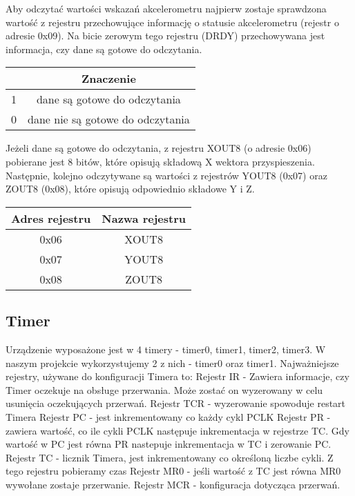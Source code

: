 \documentclass{classrep}
\begin{document}
		Aby odczytać wartości wskazań akcelerometru najpierw zostaje sprawdzona wartość z rejestru przechowujące informację o statusie akcelerometru (rejestr o adresie 0x09). Na bicie zerowym tego rejestru (DRDY) przechowywana jest informacja, czy dane są gotowe do odczytania.
\begin{center}
			\begin{tabular}{|c|c|}
			\hline 
			\vtop{\hbox{\strut \textbf{Wartość na bicie DRDY}}\hbox{\strut \textbf{rejestru 0x09}}} & \textbf{Znaczenie} \\ 
			\hline 
			1 & dane są gotowe do odczytania \\ 
			\hline 
			0 & dane nie są gotowe do odczytania \\ 
			\hline 
		\end{tabular} 
\end{center}
		
		Jeżeli dane są gotowe do odczytania, z rejestru XOUT8 (o adresie 0x06) pobierane jest 8 bitów, które opisują składową X wektora przyspieszenia. Następnie, kolejno odczytywane są wartości z rejestrów YOUT8 (0x07) oraz ZOUT8 (0x08), które opisują odpowiednio składowe Y i Z. 
		
\begin{center}
			\begin{tabular}{|c|c|}
			\hline 
			\textbf{Adres rejestru} & \textbf{Nazwa rejestru} \\ 
			\hline 
			0x06 & XOUT8 \\ 
			\hline 
			0x07 & YOUT8 \\ 
			\hline 
			0x08 &  ZOUT8\\ 
			\hline 
		\end{tabular} 
\end{center}
			
		\subsection{Timer}
		Urządzenie wyposażone jest w 4 timery - timer0, timer1, timer2, timer3. W naszym projekcie wykorzystujemy 2 z nich - timer0 oraz timer1. 
		\newline Najważniejsze rejestry, używane do konfiguracji Timera to:
		\newline \textbullet Rejestr IR - Zawiera informacje, czy Timer oczekuje na obsługe przerwania. Może zostać on wyzerowany w celu usunięcia oczekujących przerwań.
		\newline \textbullet Rejestr TCR - wyzerowanie spowoduje restart Timera
		\newline \textbullet Rejestr PC - jest inkrementowany co każdy cykl PCLK
		\newline \textbullet Rejestr PR - zawiera wartość, co ile cykli PCLK następuje inkrementacja w rejestrze TC. Gdy wartość w PC jest równa PR nastepuje inkrementacja w TC i zerowanie PC.
		\newline \textbullet Rejestr TC - licznik Timera, jest inkrementowany co określoną liczbe cykli. Z tego rejestru pobieramy czas
		\newline \textbullet Rejestr MR0 - jeśli wartość z TC jest równa MR0 wywołane zostaje przerwanie.
		\newline \textbullet Rejestr MCR - konfiguracja dotycząca przerwań.
		
\end{document}
